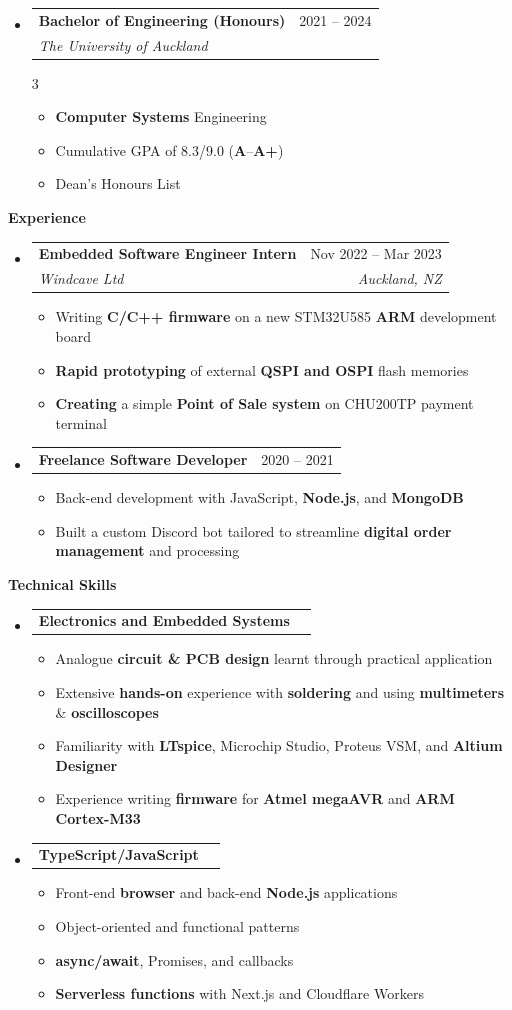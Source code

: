 \documentclass[11pt,a4paper]{article}[leftmargin=*]
\makeatletter
\def \entryspacing {-0pt}
\def \bulletstylei {\faAngleRight\hspace{-4.5pt}}
\renewcommand{\section}[2]{\vspace{5pt}
  \colorbox{secondary}{\color{white}\raggedbottom\normalsize\textbf{{#1}{\hspace{2pt}#2\hspace{4pt}}}}
}
\newcommand{\resumeEntryStart}{\begin{itemize}[leftmargin=2.5mm]}
\newcommand{\resumeEntryEnd}{\end{itemize}\vspace{\entryspacing}}
\newcommand{\resumeItemListStart}{\begin{itemize}[leftmargin=4.5mm]}
\newcommand{\resumeItemListEnd}{\end{itemize}}
\newcommand{\resumeItemListStartColumns}[2][-0.5]{\vspace*{#1\multicolsep}
\begin{multicols}{#2}\begin{itemize}[leftmargin=4.5mm]}
\newcommand{\resumeItemListEndColumns}[1][-1]{\end{itemize}\end{multicols}\vspace*{#1\multicolsep}}
\newcommand{\resumeItem}[2][\bulletstylei]{
  \item[\small#1]\small{
    {#2 \vspace{-2pt}}
  }
}
\newcommand{\resumeEntryTSDL}[4]{
  \vspace{-1pt}\item[]
    \begin{tabularx}{0.97\textwidth}{X@{\hspace{60pt}}r}
      \textbf{\color{primary}#1} & {\firabook\color{accent}\small#2} \\
      \textit{\color{accent}\small#3} & \textit{\color{accent}\small#4} \\
    \end{tabularx}\vspace{-6pt}
}
\newcommand{\resumeEntryTD}[2]{
  \vspace{-1pt}\item[]
    \begin{tabularx}{0.97\textwidth}{X@{\hspace{60pt}}r}
      \textbf{\color{primary}#1} & {\firabook\color{accent}\small#2} \\
    \end{tabularx}\vspace{-6pt}
}
\newcommand{\resumeBf}[1]{\small\textbf{\color{halfbold}#1}}
\makeatother
\begin{document}
\resumeEntryStart
\resumeEntryTSDL
{Bachelor of Engineering (Honours)}{2021 -- 2024}
{The University of Auckland}{}
\resumeItemListStartColumns[0.5]{3}
\resumeItem {\resumeBf{Computer Systems} Engineering}
\resumeItem {Cumulative GPA of 8.3/9.0 (\resumeBf{A}--\resumeBf{A+})}
\resumeItem {Dean's Honours List}
\resumeItemListEndColumns
\resumeEntryEnd


\section{\faBriefcase}{Experience}

\resumeEntryStart
\resumeEntryTSDL
{Embedded Software Engineer Intern}{Nov 2022 -- Mar 2023}
{Windcave Ltd}{Auckland, NZ}

\resumeItemListStart
\resumeItem {Writing \resumeBf{C/C++ firmware} on a new STM32U585 \resumeBf{ARM} development board}
\resumeItem {\resumeBf{Rapid prototyping} of external \resumeBf{QSPI and OSPI} flash memories}
\resumeItem {\resumeBf{Creating} a simple \resumeBf{Point of Sale system} on CHU200TP payment terminal}
\resumeItemListEnd
\resumeEntryEnd

\resumeEntryStart
\resumeEntryTD
{Freelance Software Developer}{2020 -- 2021}
\resumeItemListStart
\resumeItem {Back-end development with JavaScript, \resumeBf{Node.js}, and \resumeBf{MongoDB}}
\resumeItem {Built a custom Discord bot tailored to streamline \resumeBf{digital order management} and processing}
\resumeItemListEnd
\resumeEntryEnd


\section{\faCogs}{Technical Skills}

\resumeEntryStart
\resumeEntryTD
{Electronics and Embedded Systems}{}
\resumeItemListStart
\resumeItem {Analogue \resumeBf{circuit \& PCB design} learnt through practical application}
\resumeItem {Extensive \resumeBf{hands-on} experience with \resumeBf{soldering} and using \resumeBf{multimeters} \& \resumeBf{oscilloscopes}}
\resumeItem {Familiarity with \resumeBf{LTspice}, Microchip Studio, Proteus VSM, and \resumeBf{Altium Designer}}
\resumeItem {Experience writing \resumeBf{firmware} for \resumeBf{Atmel megaAVR} and \resumeBf{ARM Cortex-M33}}
\resumeItemListEnd
\resumeEntryEnd

\resumeEntryStart
\resumeEntryTD
{TypeScript/JavaScript}{}
\resumeItemListStart
\resumeItem {Front-end \resumeBf{browser} and back-end \resumeBf{Node.js} applications}
\resumeItem {Object-oriented and functional patterns}
\resumeItem {\resumeBf{async/await}, Promises, and callbacks}
\resumeItem {\resumeBf{Serverless functions} with Next.js and Cloudflare Workers}
\resumeItemListEnd
\resumeEntryEnd
\end{document}

